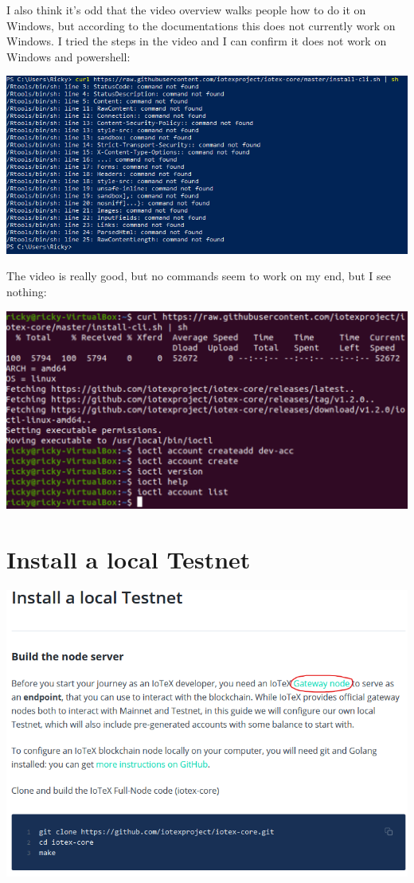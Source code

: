 \documentclass[
]{book}
\begin{document}
I also think it's odd that the video overview walks people how to do it
on Windows, but according to the documentations this does not currently
work on Windows. I tried the steps in the video and I can confirm it
does not work on Windows and powershell:

\includegraphics{images/windows_install_powershell.PNG}

The video is really good, but no commands seem to work on my end, but I
see nothing:

\includegraphics{images/linux_not_working.png}

\hypertarget{install-a-local-testnet}{%
\section{Install a local Testnet}\label{install-a-local-testnet}}

\includegraphics{images/install_local_testnet.PNG}
\end{document}
